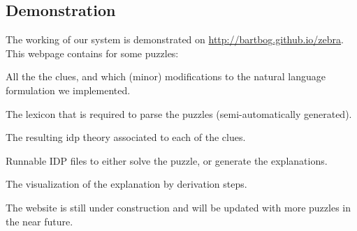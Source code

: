 \documentclass[runningheads]{llncs}
\newcommand{\idp}{IDP\xspace}
\begin{document}

\subsection{Demonstration}

The working of our system is demonstrated on \url{http://bartbog.github.io/zebra}. This webpage contains for some puzzles: 
\begin{compactitem}
 \item All the the clues, and which (minor) modifications to the natural language formulation we implemented. 
 \item The lexicon that is required to parse the puzzles (semi-automatically generated).
 \item The resulting idp theory associated to each of the clues.
 \item Runnable \idp files to either solve the puzzle, or generate the explanations. 
 \item The visualization of the explanation by derivation steps. 
\end{compactitem}
The website is still under construction and will be updated with more puzzles in the near future. 



\end{document}
